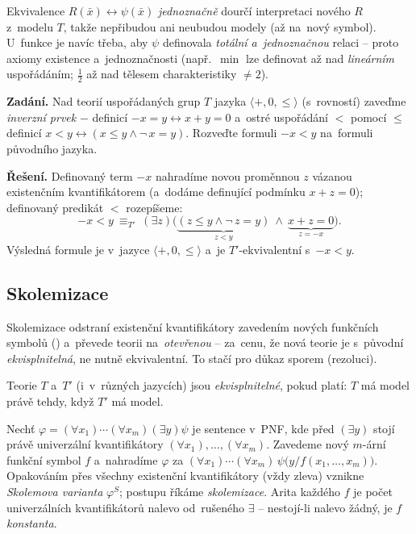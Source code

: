 \documentclass[11pt,a4paper]{article}
\begin{document}
\begin{intuice}
Ekvivalence $R(\bar x)\leftrightarrow\psi(\bar x)$ \emph{jednoznačně} dourčí interpretaci nového $R$ z~modelu $T$, takže nepřibudou ani neubudou modely (až na~nový symbol). U~funkce je navíc třeba, aby $\psi$ definovala \emph{totální a~jednoznačnou} relaci -- proto axiomy existence a~jednoznačnosti (např.\ $\min$ lze definovat až nad \emph{lineárním} uspořádáním; $\tfrac12$ až nad tělesem charakteristiky $\neq 2$).
\end{intuice}

\begin{priklad}
\textbf{Zadání.} Nad teorií uspořádaných grup $T$ jazyka $\langle+,0,\le\rangle$ (s~rovností) zaveďme \emph{inverzní prvek} $-$ definicí $-x=y\leftrightarrow x+y=0$ a~ostré uspořádání $<$ pomocí $\le$ definicí $x<y\leftrightarrow(x\le y\wedge\neg\,x=y)$. Rozveďte formuli $-x<y$ na~formuli původního jazyka.

\smallskip
\textbf{Řešení.} Definovaný term $-x$ nahradíme novou proměnnou $z$ vázanou existenčním kvantifikátorem (a~dodáme definující podmínku $x+z=0$); definovaný predikát $<$ rozepíšeme:
\[
-x<y\ \equiv_{T'}\ (\exists z)\big(\underbrace{(z\le y\wedge\neg\,z=y)}_{z<y}\ \wedge\ \underbrace{x+z=0}_{z=-x}\big).
\]
Výsledná formule je v~jazyce $\langle+,0,\le\rangle$ a~je $T'$-ekvivalentní s~$-x<y$.
\end{priklad}

\subsection{Skolemizace}

Skolemizace odstraní existenční kvantifikátory zavedením nových funkčních symbolů () a~převede teorii na~\emph{otevřenou} -- za~cenu, že nová teorie je s~původní \emph{ekvisplnitelná}, ne nutně ekvivalentní. To stačí pro důkaz sporem (rezoluci).

\begin{definice}[Ekvisplnitelnost]
Teorie $T$ a~$T'$ (i~v~různých jazycích) jsou \emph{ekvisplnitelné}, pokud platí: $T$ má model právě tehdy, když $T'$ má model.
\end{definice}

\begin{definice}
Nechť $\varphi=(\forall x_1)\cdots(\forall x_m)(\exists y)\psi$ je sentence v~PNF, kde před $(\exists y)$ stojí právě univerzální kvantifikátory $(\forall x_1),\dots,(\forall x_m)$. Zavedeme nový $m$-ární funkční symbol $f$ a~nahradíme $\varphi$ za $(\forall x_1)\cdots(\forall x_m)\,\psi\big(y/f(x_1,\dots,x_m)\big)$. Opakováním přes všechny existenční kvantifikátory (vždy zleva) vznikne \emph{Skolemova varianta} $\varphi^S$; postupu říkáme \emph{skolemizace}. Arita každého $f$ je počet univerzálních kvantifikátorů nalevo od~rušeného $\exists$ -- nestojí-li nalevo žádný, je $f$ \emph{konstanta}.
\end{definice}
\end{document}
